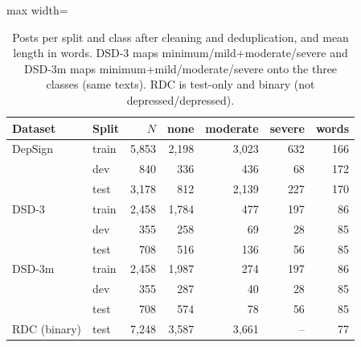 \begin{table}[t]
\centering
\caption{Posts per split and class after cleaning and deduplication, and mean length in words. DSD-3 maps minimum/mild+moderate/severe and DSD-3m maps minimum+mild/moderate/severe onto the three classes (same texts). RDC is test-only and binary (not depressed/depressed).}\label{tab:data}
\scriptsize
\setlength{\tabcolsep}{3pt}
\begin{adjustbox}{max width=\textwidth}
\begin{tabular}{llrrrrr}
\toprule
Dataset & Split & $N$ & none & moderate & severe & words \\
\midrule
DepSign & train & 5,853 & 2,198 & 3,023 & 632 & 166 \\
 & dev & 840 & 336 & 436 & 68 & 172 \\
 & test & 3,178 & 812 & 2,139 & 227 & 170 \\
\addlinespace[2pt]
DSD-3 & train & 2,458 & 1,784 & 477 & 197 & 86 \\
 & dev & 355 & 258 & 69 & 28 & 85 \\
 & test & 708 & 516 & 136 & 56 & 85 \\
\addlinespace[2pt]
DSD-3m & train & 2,458 & 1,987 & 274 & 197 & 86 \\
 & dev & 355 & 287 & 40 & 28 & 85 \\
 & test & 708 & 574 & 78 & 56 & 85 \\
\addlinespace[2pt]
RDC (binary) & test & 7,248 & 3,587 & 3,661 & -- & 77 \\
\bottomrule
\end{tabular}
\end{adjustbox}
\end{table}
